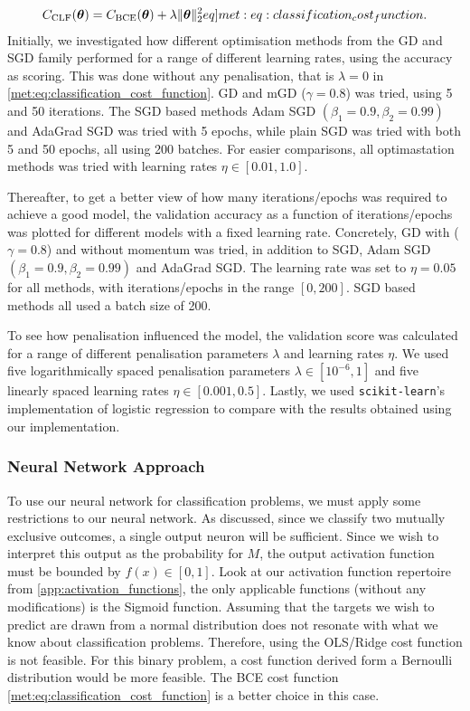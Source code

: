     \begin{align}
        \msub{C}{CLF}(\vec{\theta}) = \msub{C}{BCE}(\vec{\theta}) +  \lambda\norm[2]{\vec{\theta}}^2
        \label[eq]{met:eq:classification_cost_function}.
    \end{align}
    Initially, we investigated how different optimisation methods from the GD and SGD family performed for a range of different learning rates, using the accuracy as scoring. This was done without any penalisation, that is $\lambda = 0$ in \cref{met:eq:classification_cost_function}. GD and mGD ($\gamma = 0.8$) was tried, using 5 and 50 iterations. The SGD based methods Adam SGD $(\beta_1 = 0.9, \beta_2 = 0.99)$ and AdaGrad SGD was tried with 5 epochs, while plain SGD was tried with both 5 and 50 epochs, all using  200 batches. For easier comparisons, all optimastation methods was tried with learning rates  $\eta \in [0.01, 1.0]$.     
    
    Thereafter, to get a better view of how many iterations/epochs was required to achieve a good model, the validation accuracy as a function of iterations/epochs was plotted for different models with a fixed learning rate. Concretely, GD with ($\gamma = 0.8$) and without momentum was tried, in addition to SGD, Adam SGD $(\beta_1 = 0.9, \beta_2 = 0.99)$ and AdaGrad SGD. The learning rate was set to $\eta = 0.05$ for all methods, with iterations/epochs in the range $[0,200]$. SGD based methods all used a batch size of 200. 

    To see how penalisation influenced the model, the validation score was calculated for a range of different penalisation parameters $\lambda$ and learning rates $\eta$. We used five logarithmically spaced penalisation parameters $\lambda \in [10^{-6}, 1]$ and five linearly spaced learning rates $\eta \in [0.001, 0.5]$. Lastly, we used \verb|scikit-learn|'s implementation of logistic regression to compare with the results obtained using our implementation.

    \subsubsection{Neural Network Approach}
    To use our neural network for classification problems, we must apply some restrictions to our neural network. As discussed, since we classify two mutually exclusive outcomes, a single output neuron will be sufficient. Since we wish to interpret this output as the probability for $M$, the output activation function must be bounded by $f(x) \in [0,1]$. Look at our activation function repertoire from \cref{app:activation_functions}, the only applicable functions (without any modifications) is the Sigmoid function. Assuming that the targets we wish to predict are drawn from a normal distribution does not resonate with what we know about classification problems. Therefore, using the OLS/Ridge cost function is not feasible. For this binary problem, a cost function derived form a Bernoulli distribution would be more feasible. The BCE cost function \cref{met:eq:classification_cost_function} is a better choice in this case.     
    
